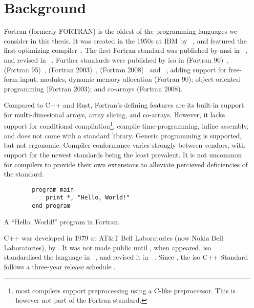 \documentclass[british]{scrreprt}
\begin{document}
\section{Background}
Fortran (formerly FORTRAN) is the oldest of the programming languages we consider in this thesis. It was created in the 1950s at IBM by ~\cite{BackusFORTRANautomaticcoding1957}, and featured the first optimizing compiler~\cite{PaduaFORTRANcompiler2000}. The first Fortran standard was published by \gls{ansi} in \citeyear{Fortran66}~\cite{Fortran66}, and revised in \citeyear{Fortran77}~\cite{Fortran77}. Further standards were published by \gls{iso} in \citeyear{Fortran90} (Fortran 90)~\cite{Fortran90}, \citeyear{Fortran95} (Fortran 95)~\cite{Fortran95}, \citeyear{Fortran2003} (Fortran 2003)~\cite{Fortran2003}, \citeyear{Fortran2008} (Fortran 2008)~\cite{Fortran2008} and \citeyear{Fortran2018}~\cite{Fortran2018}, adding support for free-form input, modules, dynamic memory allocation (Fortran 90); object-oriented programming (Fortran 2003); and co-arrays (Fortran 2008).

Compared to C++ and Rust, Fortran's defining features are its built-in support for multi-dimesional arrays, array slicing, and co-arrays. However, it lacks support for conditional compilation\footnote{most compilers support preprocessing using a C-like preprocessor. This is however not part of the Fortran standard.}, compile time-programming, inline assembly, and does not come with a standard library. Generic programming is supported, but not ergonomic. Compiler conformance varies strongly between vendors, with support for the newest standards being the least prevalent. It is not uncommon for compilers to provide their own extensions to alleviate percieved deficiencies of the standard.

\begin{listing}
	\centering
	\begin{verbatim}
		program main
			print *, "Hello, World!"
		end program
	\end{verbatim}
	\caption{A \enquote{Hello, World!} program in Fortran.}
\end{listing}

C++ was developed in 1979 at AT\&T Bell Laboratories (now Nokia Bell Laboratories), by . It was not made public until \citeyear{StroustrupProgrammingLanguage1985}, when  appeared. \gls{iso} standardised the language in \citeyear{Cpp98}~\cite{Cpp98}, and revised it in \citeyear{Cpp03}~\cite{Cpp03}. Since \citeyear{Cpp11}, the \gls{iso} C++ Standard follows a three-year release schedule \cites{Cpp11, Cpp14, Cpp17, Cpp20}.
\end{document}
